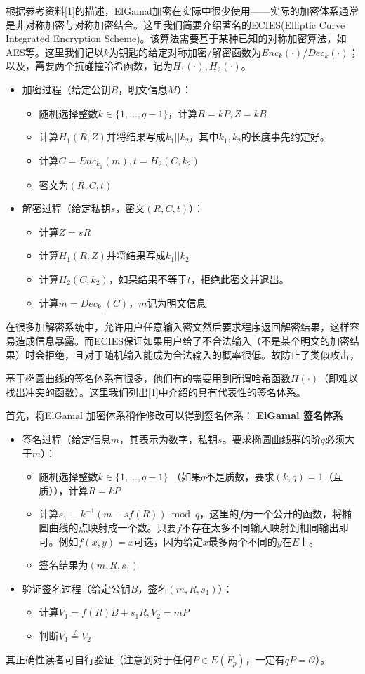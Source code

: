\documentclass[12pt]{article}
\newcommand{\ec}{椭圆曲线}
\newcommand{\oo}{\mathcal{O}}
\begin{document}
根据参考资料[1]的描述，ElGamal加密在实际中很少使用——实际的加密体系通常是非对称加密与对称加密结合。这里我们简要介绍著名的ECIES(Elliptic Curve Integrated Encryption Scheme)。该算法需要基于某种已知的对称加密算法，如AES等。这里我们记以$k$为钥匙的给定对称加密/解密函数为$Enc_k(\cdot)$/$Dec_k(\cdot)$；以及，需要两个抗碰撞哈希函数，记为$H_1(\cdot),H_2(\cdot)$。
\begin{itemize}
	\item 加密过程（给定公钥$B$，明文信息$M$）：
	\begin{itemize}
		\item 随机选择整数$k \in \{1,...,q-1\}$，计算$R=kP, Z=kB$
        \item 计算$H_1(R,Z)$并将结果写成$k_1||k_2$，其中$k_1,k_2$的长度事先约定好。
        \item 计算$C=Enc_{k_1}(m),t = H_2(C,k_2)$
        \item 密文为$(R,C,t)$
   \end{itemize} 
	\item 解密过程（给定私钥$s$，密文$(R,C,t)$）：
	\begin{itemize}
		\item 计算$Z=	sR$
		\item 计算$H_1(R,Z)$并将结果写成$k_1||k_2$
		\item 计算$H_2(C,k_2)$，如果结果不等于$t$，拒绝此密文并退出。
		\item 计算$m=Dec_{k_1}(C)$，$m$记为明文信息
	\end{itemize} 
\end{itemize}
在很多加解密系统中，允许用户任意输入密文然后要求程序返回解密结果，这样容易造成信息暴露。而ECIES保证如果用户给了不合法输入（不是某个明文的加密结果）时会拒绝，且对于随机输入能成为合法输入的概率很低。故防止了类似攻击，

基于\ec 的签名体系有很多，他们有的需要用到所谓哈希函数$H(\cdot)$（即难以找出冲突的函数）。这里我们列出[1]中介绍的具有代表性的签名体系。

首先，将ElGamal 加密体系稍作修改可以得到签名体系：
\textbf{ElGamal 签名体系}
\begin{itemize}
	\item 签名过程（给定信息$m$，其表示为数字，私钥$s$。要求\ec 群的阶$q$必须大于$m$）：
	\begin{itemize}
		\item 随机选择整数$k \in \{1,...,q-1\}$ （如果$q$不是质数，要求$(k,q)=1$（互质）），计算$R=kP$
		\item 计算$s_1 \equiv k^{-1}(m-sf(R)) \bmod q$，这里的$f$为一个公开的函数，将\ec 的点映射成一个数。只要$f$不存在太多不同输入映射到相同输出即可。例如$f(x,y)=x$可选，因为给定$x$最多两个不同的$y$在$E$上。
		\item 签名结果为$(m,R,s_1)$
	\end{itemize}
	\item 验证签名过程（给定公钥$B$，签名$(m,R,s_1)$）：
	\begin{itemize}
		\item 计算$V_1=f(R)B+s_1R,V_2=mP$
		\item 判断$V_1 \overset{?}{=} V_2$
	\end{itemize} 
\end{itemize}
其正确性读者可自行验证（注意到对于任何$P \in E(F_p)$，一定有$qP=\oo$）。
\end{document}
